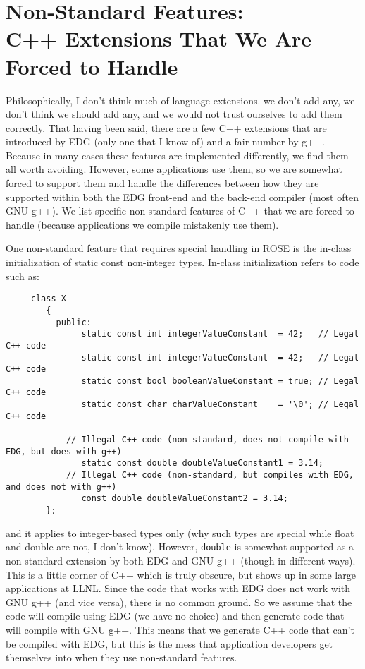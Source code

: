 \section{Non-Standard Features: \\ C++ Extensions That We Are Forced to Handle}

    Philosophically, I don't think much of language extensions. we don't add any, 
we don't think we should add any, and we would not trust ourselves to add them correctly.
That having been said, there are a few C++ extensions that are introduced by
EDG (only one that I know of) and a fair number by g++.  Because in many cases these features 
are implemented differently, we find them all worth avoiding.  However,
some applications use them, so we are somewhat forced to support them and handle the 
differences between how they are supported within both the EDG front-end and the
back-end compiler (most often GNU g++).  We list specific non-standard features of
C++ that we are forced to handle (because applications we compile mistakenly use them).

One non-standard feature that requires special handling in ROSE is the
in-class initialization of static const non-integer types. In-class initialization 
refers to code such as:
{\indent
{\mySmallFontSize
\begin{verbatim}
     class X
        {
          public:
               static const int integerValueConstant  = 42;   // Legal C++ code
               static const int integerValueConstant  = 42;   // Legal C++ code
               static const bool booleanValueConstant = true; // Legal C++ code
               static const char charValueConstant    = '\0'; // Legal C++ code

            // Illegal C++ code (non-standard, does not compile with EDG, but does with g++)
               static const double doubleValueConstant1 = 3.14; 
            // Illegal C++ code (non-standard, but compiles with EDG, and does not with g++)
               const double doubleValueConstant2 = 3.14; 
        };
\end{verbatim}
}}
           and it applies to integer-based types only (why such types are special while float
           and double are not, I don't know). However, {\tt double} is somewhat supported 
           as a non-standard extension by both EDG and GNU g++ (though in different ways).
           This is a little corner of C++ which is truly obscure, but shows up in some
           large applications at LLNL.  Since the code that works with EDG does not work
           with GNU g++ (and vice versa),
           there is no common ground.  So we assume that the code will compile using EDG
           (we have no choice) and then generate code that will compile with GNU g++.
           This means that we generate C++ code that can't be compiled with EDG, but this 
           is the mess that application developers get themselves into when they use
           non-standard features.

